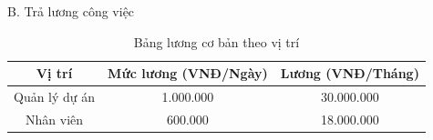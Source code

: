 B. Trả lương công việc
\begin{table}[H]
    \centering
    \renewcommand{\arraystretch}{1.5} %
    \caption{Bảng lương cơ bản theo vị trí}
    \begin{tabular}{|c|c|c|}
        \hline
        \textbf{Vị trí} & \textbf{Mức lương (VNĐ/Ngày)} & \textbf{Lương (VNĐ/Tháng)} \\
        \hline
        Quản lý dự án   & 1.000.000                     & 30.000.000                 \\
        \hline
        Nhân viên       & 600.000                       & 18.000.000                 \\
        \hline
    \end{tabular}
\end{table}

